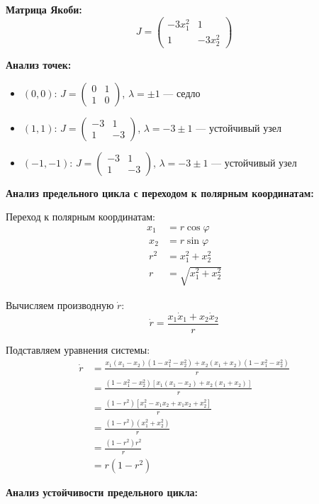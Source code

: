 \textbf{Матрица Якоби:}
$$J = \begin{pmatrix} -3x_1^2 & 1 \\ 1 & -3x_2^2 \end{pmatrix}$$

\textbf{Анализ точек:}
\begin{itemize}
\item $(0, 0)$: $J = \begin{pmatrix} 0 & 1 \\ 1 & 0 \end{pmatrix}$, $\lambda = \pm 1$ --- седло
\item $(1, 1)$: $J = \begin{pmatrix} -3 & 1 \\ 1 & -3 \end{pmatrix}$, $\lambda = -3 \pm 1$ --- устойчивый узел
\item $(-1, -1)$: $J = \begin{pmatrix} -3 & 1 \\ 1 & -3 \end{pmatrix}$, $\lambda = -3 \pm 1$ --- устойчивый узел
\end{itemize}

\textbf{Анализ предельного цикла с переходом к полярным координатам:}

Переход к полярным координатам:
\begin{align}
x_1 &= r\cos\varphi \\\
x_2 &= r\sin\varphi \\\
r^2 &= x_1^2 + x_2^2 \\\
r &= \sqrt{x_1^2 + x_2^2}
\end{align}

Вычисляем производную $\dot{r}$:
$$\dot{r} = \frac{x_1\dot{x}_1 + x_2\dot{x}_2}{r}$$

Подставляем уравнения системы:
\begin{align}
\dot{r} &= \frac{x_1(x_1 - x_2)(1 - x_1^2 - x_2^2) + x_2(x_1 + x_2)(1 - x_1^2 - x_2^2)}{r} \\\
&= \frac{(1 - x_1^2 - x_2^2)[x_1(x_1 - x_2) + x_2(x_1 + x_2)]}{r} \\\
&= \frac{(1 - r^2)[x_1^2 - x_1x_2 + x_1x_2 + x_2^2]}{r} \\\
&= \frac{(1 - r^2)(x_1^2 + x_2^2)}{r} \\\
&= \frac{(1 - r^2)r^2}{r} \\\
&= r(1 - r^2)
\end{align}

\textbf{Анализ устойчивости предельного цикла:}

